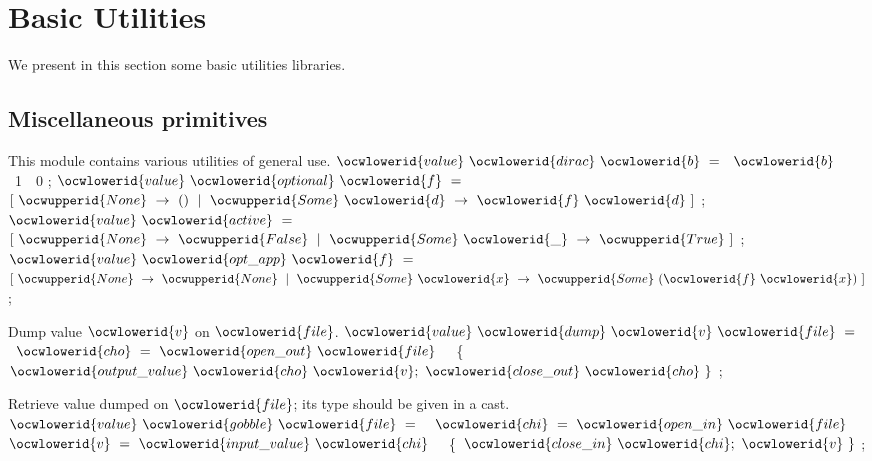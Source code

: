 \documentclass[12pt]{article}
\begin{document}
\ocweol
\section{Basic Utilities} 

We present in this section some basic utilities libraries.

\subsection{Miscellaneous primitives} 

\label{../ML/gen.ml:0}%
This module contains various utilities of general use. 
\ocweol
\label{../ML/gen.ml:708}%
\medskip
\ocwbegincode{}\ocwindent{0.00em}
$\ocwlowerid{value}~\ocwlowerid{dirac}~\ocwlowerid{b}~=~$~$\ocwlowerid{b}~$~1~~0\ocweol
\ocwindent{0.00em}
;\ocweol
\ocwindent{0.00em}
$\ocwlowerid{value}~\ocwlowerid{optional}~\ocwlowerid{f}~=~$~$[~\ocwupperid{None}~\rightarrow{}~()~\mid{}~\ocwupperid{Some}~\ocwlowerid{d}~\rightarrow{}~\ocwlowerid{f}~\ocwlowerid{d}~]$\ocweol
\ocwindent{0.00em}
;\ocweol
\ocwindent{0.00em}
$\ocwlowerid{value}~\ocwlowerid{active}~=~$~$[~\ocwupperid{None}~\rightarrow{}~\ocwupperid{False}~\mid{}~\ocwupperid{Some}~\ocwlowerid{\_}~\rightarrow{}~\ocwupperid{True}~]$\ocweol
\ocwindent{0.00em}
;\ocweol
\ocwindent{0.00em}
$\ocwlowerid{value}~\ocwlowerid{opt\_app}~\ocwlowerid{f}~=~$~$[~\ocwupperid{None}~\rightarrow{}~\ocwupperid{None}~\mid{}~\ocwupperid{Some}~\ocwlowerid{x}~\rightarrow{}~\ocwupperid{Some}~(\ocwlowerid{f}~\ocwlowerid{x})~]$\ocweol
\ocwindent{0.00em}
;\medskip

\ocwendcode{}\ocwindent{0.00em}
Dump value \ocwbegindcode{}$\ocwlowerid{v}$\ocwenddcode{} on \ocwbegindcode{}$\ocwlowerid{file}$\ocwenddcode{}. 
\ocweol
\label{../ML/gen.ml:954}%
\medskip
\ocwbegincode{}\ocwindent{0.00em}
$\ocwlowerid{value}~\ocwlowerid{dump}~\ocwlowerid{v}~\ocwlowerid{file}~=~$\ocweol
\ocwindent{1.00em}
~$\ocwlowerid{cho}~=~\ocwlowerid{open\_out}~\ocwlowerid{file}~$~~\{~$\ocwlowerid{output\_value}~\ocwlowerid{cho}~\ocwlowerid{v};~\ocwlowerid{close\_out}~\ocwlowerid{cho}~\}$\ocweol
\ocwindent{0.00em}
;\medskip

\ocwendcode{}\ocwindent{0.00em}
Retrieve value dumped on \ocwbegindcode{}$\ocwlowerid{file}$\ocwenddcode{}; its type should be given in a cast. 
\ocweol
\label{../ML/gen.ml:1123}%
\medskip
\ocwbegincode{}\ocwindent{0.00em}
$\ocwlowerid{value}~\ocwlowerid{gobble}~\ocwlowerid{file}~=~$\ocweol
\ocwindent{1.00em}
~$\ocwlowerid{chi}~=~\ocwlowerid{open\_in}~\ocwlowerid{file}~$\ocweol
\ocwindent{1.00em}
~$\ocwlowerid{v}~=~\ocwlowerid{input\_value}~\ocwlowerid{chi}~$~~\{~$\ocwlowerid{close\_in}~\ocwlowerid{chi};~\ocwlowerid{v}~\}$\ocweol
\ocwindent{0.00em}
;\medskip
\end{document}
